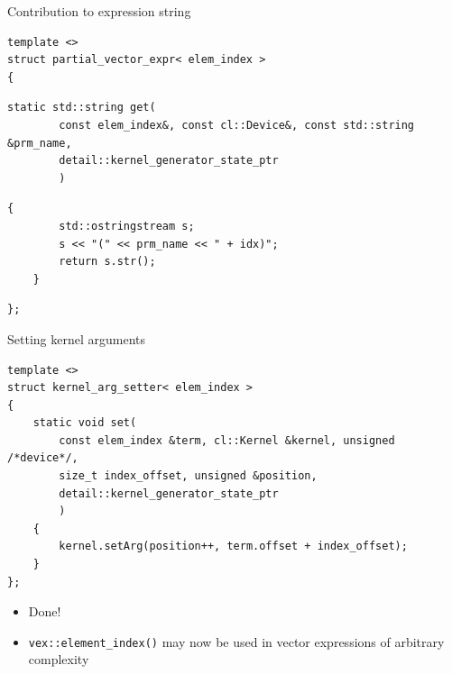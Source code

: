 \documentclass[@BEAMER_OPTIONS@]{beamer}
\newcommand{\code}[1]{\lstinline|#1|}
\begin{document}
\begin{frame}[fragile]{Contribution to expression string}
    \begin{exampleblock}{}
            \begin{lstlisting}
template <>
struct partial_vector_expr< elem_index >
{
    \end{lstlisting}
    \begin{lstlisting}[firstnumber=last]
    static std::string get(
        const elem_index&, const cl::Device&, const std::string &prm_name,
        detail::kernel_generator_state_ptr
        )
    \end{lstlisting}
    \begin{lstlisting}[firstnumber=last]
    {
        std::ostringstream s;
        s << "(" << prm_name << " + idx)";
        return s.str();
    }
    \end{lstlisting}
    \begin{lstlisting}[firstnumber=last]
};
            \end{lstlisting}
    \end{exampleblock}
\end{frame}

\note{ }

\begin{frame}[fragile]{Setting kernel arguments}
    \begin{exampleblock}{}
        \begin{lstlisting}
template <>
struct kernel_arg_setter< elem_index >
{
    static void set(
        const elem_index &term, cl::Kernel &kernel, unsigned /*device*/,
        size_t index_offset, unsigned &position,
        detail::kernel_generator_state_ptr
        )
    {
        kernel.setArg(position++, term.offset + index_offset);
    }
};
        \end{lstlisting}
    \end{exampleblock}
    \begin{itemize}
        \item Done!
        \item \code{vex::element_index()} may now be used in
            vector expressions of arbitrary complexity
    \end{itemize}
\end{frame}

\note{}
\end{document}

